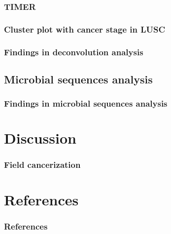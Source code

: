 \documentclass{beamer}
\begin{document}
            \subsubsection{TIMER}
                \begin{frame}
                    \frametitle{Cluster plot with cancer stage in LUSC}
                \end{frame}

            \begin{frame}
                \frametitle{Findings in deconvolution analysis}
            \end{frame}

        \subsection{Microbial sequences analysis}
            \begin{frame}
                \frametitle{Findings in microbial sequences analysis}
            \end{frame}

    \section{Discussion}
        \begin{frame}
            \frametitle{Field cancerization}
        \end{frame}

    \section{References}
    \begin{frame}[allowframebreaks]
        \frametitle{References}
        
        
    \end{frame}
\end{document}
